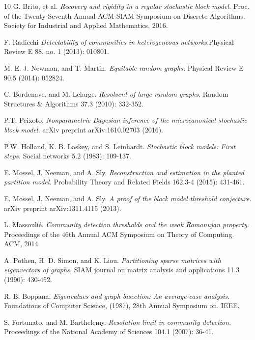 \documentclass[%
 reprint,
 amsmath,amssymb,
 aps,
 pre,
 showpacs
]{revtex4-1}
\begin{document}
\begin{thebibliography}{10}
 G. Brito, et al. \textit{Recovery and rigidity in a regular stochastic block model.} Proc. of the Twenty-Seventh Annual ACM-SIAM Symposium on Discrete Algorithms. Society for Industrial and Applied Mathematics, 2016.

F. Radicchi \textit{Detectability of communities in heterogeneous networks.}Physical Review E 88, no. 1 (2013): 010801.

 M. E. J. Newman, and T. Martin. \textit{Equitable random graphs.} Physical Review E 90.5 (2014): 052824.

C. Bordenave, and M. Lelarge. \textit{Resolvent of large random graphs.} Random Structures \& Algorithms 37.3 (2010): 332-352.

P.T. Peixoto, \textit{Nonparametric Bayesian inference of the microcanonical stochastic block model.} arXiv preprint arXiv:1610.02703 (2016).

P.W. Holland, K. B. Laskey, and S. Leinhardt. \textit{Stochastic block models: First steps.} Social networks 5.2 (1983): 109-137.

E. Mossel, J. Neeman, and A. Sly. \textit{Reconstruction and estimation in the planted partition model.} Probability Theory and Related Fields 162.3-4 (2015): 431-461.

E. Mossel, J. Neeman, and A. Sly. \textit{A proof of the block model threshold conjecture.} arXiv preprint arXiv:1311.4115 (2013).

L. Massouli\'e. \textit{Community detection thresholds and the weak Ramanujan property.} Proceedings of the 46th Annual ACM Symposium on Theory of Computing. ACM, 2014.

A. Pothen, H. D. Simon, and K. Liou. \textit{Partitioning sparse matrices with eigenvectors of graphs.} SIAM journal on matrix analysis and applications 11.3 (1990): 430-452.

R. B. Boppana. \textit{Eigenvalues and graph bisection: An average-case analysis.} Foundations of Computer Science, (1987), 28th Annual Symposium on. IEEE.

S. Fortunato, and M. Barthelemy. \textit{Resolution limit in community detection.} Proceedings of the National Academy of Sciences 104.1 (2007): 36-41.


\end{thebibliography}
\end{document}
